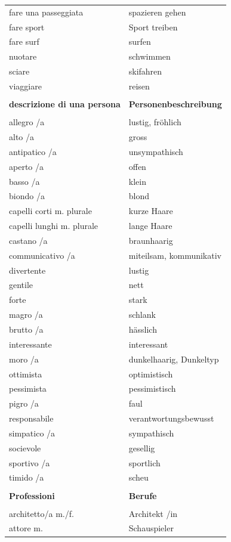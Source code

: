 \documentclass[10pt]{scrartcl}
\begin{document}
\begin{multicols*}{2}
\begin{supertabular}{p{4cm}p{4cm}}
fare una passeggiata & spazieren gehen\\
fare sport & Sport treiben\\
fare surf & surfen\\
nuotare & schwimmen\\
sciare & skifahren\\
viaggiare & reisen\\
\\
\textbf{descrizione di una persona} & \textbf{Personenbeschreibung}\\
\\
allegro /a & lustig, fröhlich\\
alto /a & gross\\
antipatico /a & unsympathisch\\
aperto /a & offen\\
basso /a & klein\\
biondo /a & blond\\
capelli corti \hfill m. plurale & kurze Haare\\
capelli lunghi \hfill m. plurale & lange Haare\\
castano /a & braunhaarig\\
communicativo /a & miteilsam, kommunikativ\\
divertente & lustig\\
gentile & nett\\
forte & stark\\
magro /a & schlank\\
brutto /a & hässlich\\
interessante & interessant\\
moro /a & dunkelhaarig, Dunkeltyp\\
ottimista & optimistisch\\
pessimista & pessimistisch\\
pigro /a & faul\\
responsabile & verantwortungsbewusst\\
simpatico /a & sympathisch\\
socievole & gesellig\\
sportivo /a & sportlich\\
timido /a & scheu\\
\\
\textbf{Professioni} & \textbf{Berufe}\\
\\
architetto/a \hfill m./f. & Architekt /in\\
attore \hfill m. & Schauspieler\\

\end{supertabular}
\end{multicols*}
\end{document}
